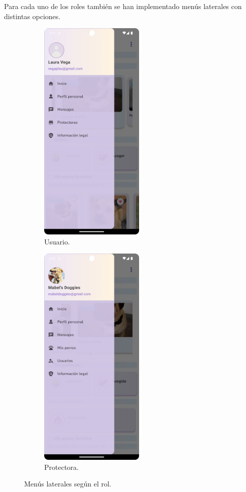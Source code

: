 \documentclass[a4paper, 12pt]{article}
\begin{document}
Para cada uno de los roles también se han implementado menús laterales con distintas opciones.

\begin{figure}[H]
   	\begin{subfigure}{0.48\textwidth}
		\begin{center}
			{\includegraphics[width=5cm]{app/UserSideMenu.png}\par}
			\caption{Usuario.}
		\end{center}  
	\end{subfigure}\hfill
   	\begin{subfigure}{0.48\textwidth}
		\begin{center}
			{\includegraphics[width=5cm]{app/CompanySideMenu.png}\par}
			\caption{Protectora.}
		\end{center}  
	\end{subfigure}\hfill
	\caption{Menús laterales según el rol.}
\end{figure}
\end{document}
